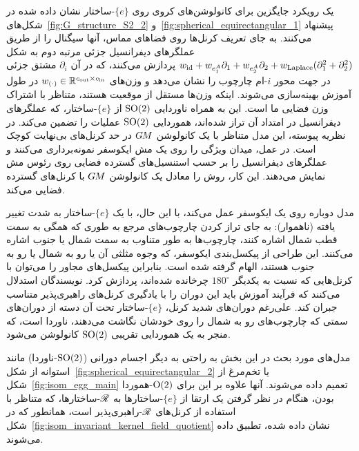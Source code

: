 \citet{jiang2019spherical} یک رویکرد جایگزین برای کانولوشن‌های کروی روی $\{e\}$-ساختار نشان داده شده در شکل‌های~\ref{fig:G_structure_S2_2} و~\ref{fig:spherical_equirectangular_1} پیشنهاد می‌کنند.
به جای تعریف کرنل‌ها روی فضاهای مماس، آنها سیگنال را از طریق عملگرهای دیفرانسیل جزئی مرتبه دوم به شکل $w_{\mathrm{id}} + w_{e^A_1} \partial_1 + w_{e^A_2} \partial_2 + w_\textup{Laplace} (\partial_1^2 + \partial_2^2)$ پردازش می‌کنند، که در آن $\partial_i$ مشتق جزئی در جهت محور $i$-ام چارچوب را نشان می‌دهد و وزن‌های $w_{(\cdot)} \in \mathbb{R}^{{c_\textup{out}}\times{c_\textup{in}}}$ در طول آموزش بهینه‌سازی می‌شوند.
اینکه وزن‌ها مستقل از موقعیت هستند، متناظر با اشتراک وزن فضایی ما است.
این به همراه ناوردایی $\operatorname{SO}(2)$ از $\{e\}$-ساختار، که عملگرهای دیفرانسیل در امتداد آن تراز شده‌اند، هموردایی $\operatorname{SO}(2)$ عملیات را تضمین می‌کند.
در نظریه پیوسته، این مدل متناظر با یک کانولوشن $G\mkern-1.4muM$ در حد کرنل‌های بی‌نهایت کوچک است.
در عمل، \citet{jiang2019spherical} میدان ویژگی را روی یک مش ایکوسفر نمونه‌برداری می‌کنند و عملگرهای دیفرانسیل را بر حسب استنسیل‌های گسترده فضایی روی رئوس مش نمایش می‌دهند.
این کار، روش را معادل یک کانولوشن $G\mkern-1.4muM$ با کرنل‌های گسترده فضایی می‌کند.


مدل \citet{lee2019spherephd} دوباره روی یک ایکوسفر عمل می‌کند، با این حال، با یک $\{e\}$-ساختار به شدت تغییر یافته (ناهموار):
به جای تراز کردن چارچوب‌های مرجع به طوری که همگی به سمت قطب شمال اشاره کنند، چارچوب‌ها به طور متناوب به سمت شمال یا جنوب اشاره می‌کنند.
این طراحی از پیکسل‌بندی ایکوسفر، که وجوه مثلثی آن یا رو به شمال یا رو به جنوب هستند، الهام گرفته شده است.
بنابراین پیکسل‌های مجاور را می‌توان با کرنل‌هایی که نسبت به یکدیگر $180^\circ$ چرخانده شده‌اند، پردازش کرد.
نویسندگان استدلال می‌کنند که فرآیند آموزش باید این دوران را با یادگیری کرنل‌های راهبری‌پذیر متناسب جبران کند.
علی‌رغم دوران‌های شدید کرنل، $\{e\}$-ساختار تحت آن دسته از دوران‌های سمتی که چارچوب‌های رو به شمال را روی خودشان نگاشت می‌دهند، ناوردا است، که منجر به یک هموردایی تقریبی $\operatorname{SO}(2)$ کانولوشن می‌شود.


مدل‌های مورد بحث در این بخش به راحتی به دیگر اجسام دورانی ($\operatorname{SO}(2)$-ناوردا) مانند استوانه از شکل~\ref{fig:spherical_equirectangular_2} یا تخم‌مرغ از شکل~\ref{fig:isom_egg_main} تعمیم داده می‌شوند.
آنها علاوه بر این برای $\operatorname{O}(2)$-هموردا بودن، هنگام در نظر گرفتن یک ارتقا از $\{e\}$-ساختارها به $\mathscr{R}$-ساختارها، که متناظر با استفاده از کرنل‌های $\mathscr{R}$-راهبری‌پذیر است، همانطور که در شکل~\ref{fig:isom_invariant_kernel_field_quotient} نشان داده شده، تطبیق داده می‌شوند.